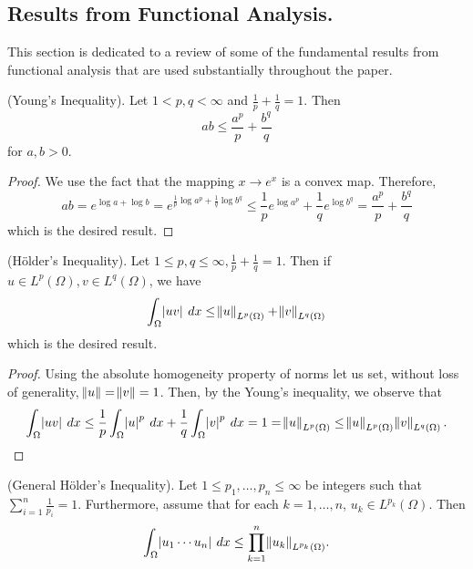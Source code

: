 \documentclass[10pt]{article}
\begin{document}
\subsection{Results from Functional Analysis.}
This section is dedicated to a review of some of the fundamental results from functional analysis that are used substantially throughout the paper. 
\begin{lemma}
	(Young's Inequality). Let $1 < p, q < \infty$ and $\tfrac{1}{p} + \tfrac{1}{q} = 1$. Then 
	\begin{equation*}
		\displaystyle ab \leq \frac{a^p}{p} + \frac{b^q}{q}
	\end{equation*}
	for $a,b > 0$.
\end{lemma} 
\begin{proof}
	We use the fact that the mapping $x \to e^x$ is a convex map. Therefore, 
	\begin{equation*}
		\displaystyle ab = e^{\log a + \log b} = e^{\tfrac{1}{p}\log a^p + \tfrac{1}{q}\log b^q} \leq \frac{1}{p}e^{\log a^p} + \frac{1}{q}e^{\log b^q} = \frac{a^p}{p} + \frac{b^q}{q}
	\end{equation*}
	which is the desired result.
\end{proof}
\begin{lemma}
	(H\"{o}lder's Inequality). Let $1 \leq p,q \leq \infty, \tfrac{1}{p} + \tfrac{1}{q} = 1$. Then if $u \in L^p(\Omega), v \in L^q(\Omega)$, we have 
	\begin{equation*}
		\displaystyle \int_{\Omega}{\abs{uv} \: dx} \leq \norm{u}_{L^p(\Omega)} + \norm{v}_{L^q(\Omega)}
	\end{equation*}
	which is the desired result.
\end{lemma}
\begin{proof}
	Using the absolute homogeneity property of norms let us set, without loss of generality, $\norm{u} = \norm{v} = 1$. Then, by the Young's inequality, we observe that 
	\begin{equation*}
		\displaystyle \int_{\Omega}{\abs{uv} \: dx} \leq \frac{1}{p}\int_{\Omega}{\abs{u}^p \: dx} + \frac{1}{q}\int_{\Omega}{\abs{v}^{p} \: dx} = 1 = \norm{u}_{L^p(\Omega)} \leq \norm{u}_{L^p(\Omega)}\norm{v}_{L^q(\Omega)}. 
	\end{equation*}
\end{proof}
\begin{lemma}
	(General H\"older's Inequality). Let $1 \leq p_1, \dots, p_n \leq \infty$ be integers such that $\sum_{i=1}^{n}{\tfrac{1}{p_i}} = 1$. Furthermore, assume that for each $k =1, \dots, n$, $u_k \in L^{p_k}(\Omega)$. Then 
	\begin{equation*}
		\displaystyle \int_{\Omega}{\abs{u_1\cdots u_n} \: dx} \leq \prod\limits_{k = 1}^{n}{\norm{u_k}_{L^{p_k}(\Omega)}}.
	\end{equation*}
\end{lemma}
\end{document}
